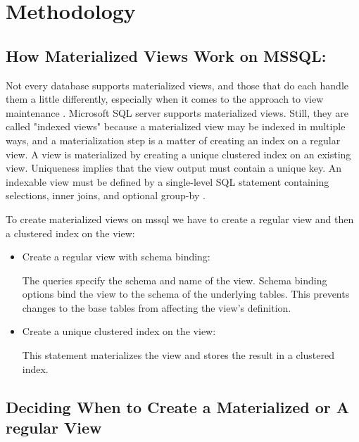 \section{Methodology}\vspace{.4cm}

 \subsection{How Materialized Views Work on MSSQL:} Not every database supports materialized views, and those that do each handle them a little differently, especially when it comes to the approach to view maintenance \cite{hattemer-2020}. Microsoft SQL server supports materialized views. Still, they are called "indexed views" because a materialized view may be indexed in multiple ways, and a materialization step is a matter of creating an index on a regular view. A view is materialized by creating a unique clustered index on an existing view. Uniqueness implies that the view output must contain a unique key. An indexable view must be defined by a single-level SQL statement containing selections, inner joins, and optional group-by \cite{goldstein-2001}.\vspace{0.8cm}

 To create materialized views on mssql we have to create a  regular view and then a clustered index on the view:
 \begin{itemize}
     \item {Create a regular view with schema binding:}\vspace{0.4cm}
     

The queries specify the schema and name of the view. Schema binding options bind the view to the schema of the underlying tables. This prevents changes to the base tables from affecting the view's definition.
      \item {Create a unique clustered index on the view:}\vspace{0.4cm}
      
 \vspace{0.4cm}

This statement materializes the view and stores the result in a clustered index.
\end{itemize}



 
\subsection{Deciding When to Create a Materialized or A regular View}\vspace{0.4cm}

